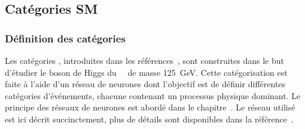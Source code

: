 \subsection{Catégories \og SM \fg{}}\label{chapter-HTT_analysis-section-categorisation-SM}
\subsubsection{Définition des catégories}
Les catégories \CATsm, introduites dans les références~\cite{CMS-NOTE-2019-177,CMS-NOTE-2019-178}, sont construites dans le but d'étudier le boson de Higgs du \SM\ \higgs\ de masse \SI{125}{\GeV}.
Cette catégorisation est faite à l'aide d'un réseau de neurones dont l'objectif est de définir différentes catégories d'événements, chacune contenant un processus physique dominant.
Le principe des réseaux de neurones est abordé dans le chapitre~.
Le réseau utilisé est ici décrit succinctement, plus de détails sont disponibles dans la référence~\cite{CMS-NOTE-2019-178}.
